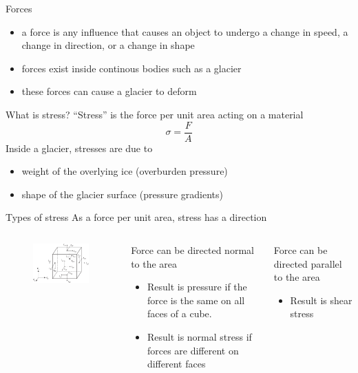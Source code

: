 \documentclass[hide notes,intlimits]{beamer}
\begin{document}
\begin{frame}{Forces}
  \begin{itemize}
  \item a force is any influence that causes an object to undergo a change in speed, a change in direction, or a change in shape
  \item forces exist inside continous bodies such as a glacier
  \item these forces can cause a glacier to deform
  \end{itemize}
\end{frame}

\begin{frame}{What is stress?}
  ``Stress'' is the force per unit area acting on a material
  \begin{displaymath}
    \sigma = \frac{F}{A}
  \end{displaymath}
  Inside a glacier, stresses are due to
  \begin{itemize}
  \item weight of the overlying ice (overburden pressure)
  \item shape of the glacier surface (pressure gradients)
  \end{itemize}
\end{frame}


\begin{frame}{Types of stress}
  As a force per unit area, stress has a direction
  \begin{columns}
    \column[c]{5cm}
    \begin{figure}
      \includegraphics[width=4.75cm]{figures/fig_3_08}
    \end{figure}
    \column[c]{6.5cm}
   \begin{block}{}
      Force can be directed normal to the area
      \begin{itemize}
      \item Result is \alert{pressure} if the force is the same on all faces of a cube.
      \item Result is \alert{normal stress} if forces are different on different faces
      \end{itemize}
    \end{block}
    \begin{block}{} 
      Force can be directed parallel to the area
      \begin{itemize}
      \item Result is \alert{shear stress}
      \end{itemize}
    \end{block}
  \end{columns}
\end{frame}
\end{document}
